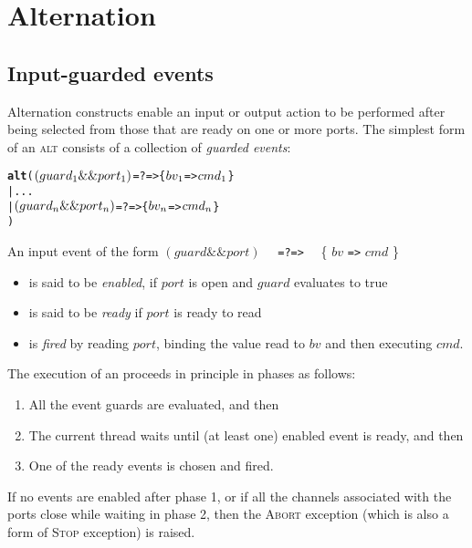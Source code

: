 \documentclass[12pt]{IOS-Book-Article-CPA-2017}
\def\AND{\mathtt{\&\&}}
\begin{document}
\section{Alternation}
\label{Input Alternation}
\subsection{Input-guarded events}
%
Alternation constructs enable an input or output action to be
performed after being selected from those that are ready on one or more ports. 
The simplest form of an \textsc{alt} consists of a collection of 
\textit{guarded events}:

\begin{alltt}
        \textsf{\textbf{alt}} ( \( (guard\sb1 \AND port\sb1) \) \texttt{=?=>} \{ \(bv\sb1\) \texttt{=>} \(cmd\sb1\) \}
           | ...
           | \( (guard\sb{n} \AND port\sb{n}) \) \texttt{=?=>} \{ \(bv\sb{n}\) \texttt{=>} \(cmd\sb{n}\)\}
           )
\end{alltt}
%
An input event of the form \((guard \AND port)\) ~~\verb/=?=>/~~ \{ \(bv\) \verb/=>/ \(cmd\) \} 
\begin{itemize}
\item is said to be \textit{enabled}, if $port$ is open and $guard$ evaluates to true
\item is said to be \textit{ready} if $port$ is ready to read
\item is \textit{fired} by reading $port$, binding the value read to $bv$ and then executing $cmd$.
\end{itemize}
The execution of an  proceeds
in principle in phases as follows:
\begin{enumerate}
\item All the event guards are evaluated, and then
\item The current thread waits until (at least one) enabled event is ready, and then
\item One of the ready events is chosen and fired.
\end{enumerate} 

If no events are enabled after phase 1, or if all the channels
associated with the ports close while waiting in phase 2, then the
\textsc{Abort} exception (which is also a form of \textsc{Stop}
exception) is raised.
\end{document}
